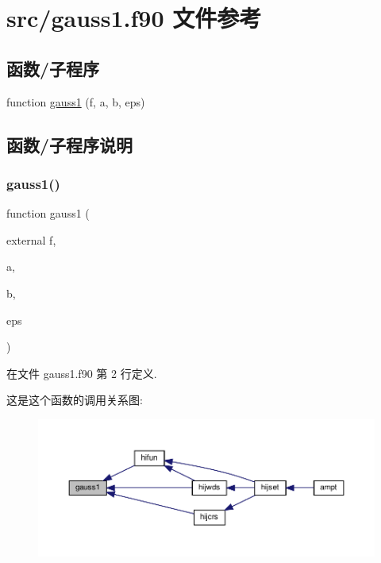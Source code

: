 \hypertarget{gauss1_8f90}{}\section{src/gauss1.f90 文件参考}
\label{gauss1_8f90}
\subsection*{函数/子程序}
\begin{DoxyCompactItemize}
\item 
function \mbox{\hyperlink{gauss1_8f90_a798fb93bcef53b5fe50d9850b6d35984}{gauss1}} (f, a, b, eps)
\end{DoxyCompactItemize}


\subsection{函数/子程序说明}
\mbox{\label{gauss1_8f90_a798fb93bcef53b5fe50d9850b6d35984}} 
\subsubsection{\texorpdfstring{gauss1()}{gauss1()}}
{\footnotesize\ttfamily function gauss1 (\begin{DoxyParamCaption}\item[{external}]{f,  }\item[{}]{a,  }\item[{}]{b,  }\item[{}]{eps }\end{DoxyParamCaption})}



在文件 gauss1.\+f90 第 2 行定义.

这是这个函数的调用关系图\+:
\nopagebreak
\begin{figure}[H]
\begin{center}
\leavevmode
\includegraphics[width=350pt]{gauss1_8f90_a798fb93bcef53b5fe50d9850b6d35984_icgraph}
\end{center}
\end{figure}
